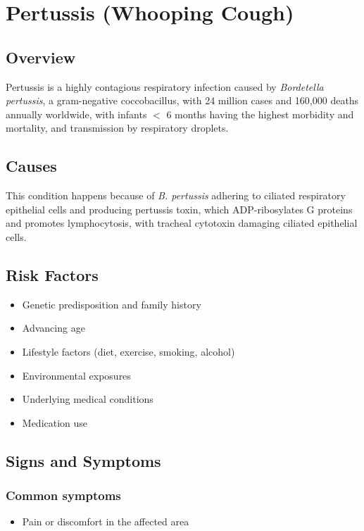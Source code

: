 \chapter{Pertussis (Whooping Cough)}
\label{sec:Pertussis}

\section{Overview}
Pertussis is a highly contagious respiratory infection caused by \textit{Bordetella pertussis}, a gram-negative coccobacillus, with 24 million cases and 160,000 deaths annually worldwide, with infants $<$ 6 months having the highest morbidity and mortality, and transmission by respiratory droplets.
\section{Causes}
This condition happens because of \textit{B. pertussis} adhering to ciliated respiratory epithelial cells and producing pertussis toxin, which ADP-ribosylates G proteins and promotes lymphocytosis, with tracheal cytotoxin damaging ciliated epithelial cells.     
\section{Risk Factors}

\begin{itemize}[noitemsep]
  \item Genetic predisposition and family history
  \item Advancing age
  \item Lifestyle factors (diet, exercise, smoking, alcohol)
  \item Environmental exposures
  \item Underlying medical conditions
  \item Medication use
\end{itemize}
\section{Signs and Symptoms}

\subsection{Common symptoms}
\begin{itemize}[noitemsep]
  \item Pain or discomfort in the affected area
  \end{itemize}


